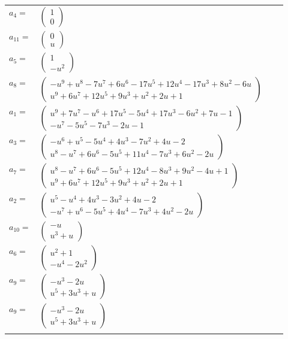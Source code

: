 \documentclass[1p]{elsarticle_modified}
\theoremstyle{definition}
\begin{document}
\begin{tabular}{m{7pt} m{180pt} m{7pt} m{180pt} }
\flushright $a_{4}=$&$\begin{pmatrix}1\\0\end{pmatrix}$ \\
\flushright $a_{11}=$&$\begin{pmatrix}0\\u\end{pmatrix}$ \\
\flushright $a_{5}=$&$\begin{pmatrix}1\\- u^2\end{pmatrix}$ \\
\flushright $a_{8}=$&$\begin{pmatrix}- u^9+u^8-7 u^7+6 u^6-17 u^5+12 u^4-17 u^3+8 u^2-6 u\\u^9+6 u^7+12 u^5+9 u^3+u^2+2 u+1\end{pmatrix}$ \\
\flushright $a_{1}=$&$\begin{pmatrix}u^9+7 u^7- u^6+17 u^5-5 u^4+17 u^3-6 u^2+7 u-1\\- u^7-5 u^5-7 u^3-2 u-1\end{pmatrix}$ \\
\flushright $a_{3}=$&$\begin{pmatrix}- u^6+u^5-5 u^4+4 u^3-7 u^2+4 u-2\\u^8- u^7+6 u^6-5 u^5+11 u^4-7 u^3+6 u^2-2 u\end{pmatrix}$ \\
\flushright $a_{7}=$&$\begin{pmatrix}u^8- u^7+6 u^6-5 u^5+12 u^4-8 u^3+9 u^2-4 u+1\\u^9+6 u^7+12 u^5+9 u^3+u^2+2 u+1\end{pmatrix}$ \\
\flushright $a_{2}=$&$\begin{pmatrix}u^5- u^4+4 u^3-3 u^2+4 u-2\\- u^7+u^6-5 u^5+4 u^4-7 u^3+4 u^2-2 u\end{pmatrix}$ \\
\flushright $a_{10}=$&$\begin{pmatrix}- u\\u^3+u\end{pmatrix}$ \\
\flushright $a_{6}=$&$\begin{pmatrix}u^2+1\\- u^4-2 u^2\end{pmatrix}$ \\
\flushright $a_{9}=$&$\begin{pmatrix}- u^3-2 u\\u^5+3 u^3+u\end{pmatrix}$\\ \flushright $a_{9}=$&$\begin{pmatrix}- u^3-2 u\\u^5+3 u^3+u\end{pmatrix}$\\&\end{tabular}
\end{document}
